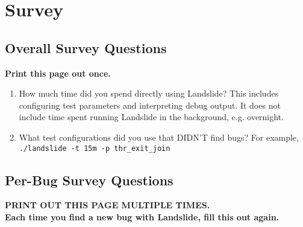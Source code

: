 \documentclass{article}
\begin{document}
\newpage

\section{Survey}
\subsection{Overall Survey Questions}

\begin{center}
{\bf Print this page out once.}
\end{center}

\begin{enumerate}
	\item How much time did you spend directly using Landslide? This includes configuring test parameters and interpreting debug output. It does not include time spent running Landslide in the background, e.g. overnight.
		\vspace{0.5in}

	\item What test configurations did you use that DIDN'T find bugs? For example, {\tt ./landslide -t 15m -p thr\_exit\_join}
\end{enumerate}

\newpage
\subsection{Per-Bug Survey Questions}
\begin{center}
{\bf \large PRINT OUT THIS PAGE MULTIPLE TIMES.
\\

Each time you find a new bug with Landslide, fill this out again.}
\end{center}
\end{document}
